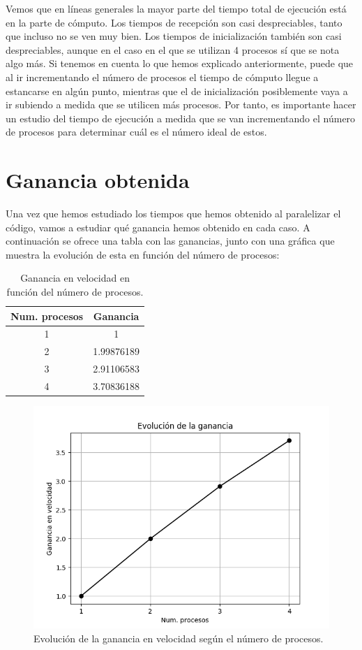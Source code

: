 \documentclass[11pt,a4paper]{article}
\begin{document}
Vemos que en líneas generales la mayor parte del tiempo total de ejecución está en la parte de
cómputo. Los tiempos de recepción son casi despreciables, tanto que incluso no se ven muy bien.
Los tiempos de inicialización también son casi despreciables, aunque en el caso en el que se
utilizan 4 procesos sí que se nota algo más. Si tenemos en cuenta lo que hemos explicado
anteriormente, puede que al ir incrementando el número de procesos el tiempo de cómputo
llegue a estancarse en algún punto, mientras que el de inicialización posiblemente vaya
a ir subiendo a medida que se utilicen más procesos. Por tanto, es importante hacer un estudio
del tiempo de ejecución a medida que se van incrementando el número de procesos para determinar
cuál es el número ideal de estos.

\section{Ganancia obtenida}

Una vez que hemos estudiado los tiempos que hemos obtenido al paralelizar el código, vamos
a estudiar qué ganancia hemos obtenido en cada caso. A continuación se ofrece una tabla
con las ganancias, junto con una gráfica que muestra la evolución de esta en función del
número de procesos:

\begin{table}[H]
\centering
\begin{tabular}{|c|c|}
\hline
\textbf{Num. procesos} & \textbf{Ganancia} \\ \hline
1 & 1 \\ \hline
2 & 1.99876189 \\ \hline
3 & 2.91106583 \\ \hline
4 & 3.70836188 \\ \hline
\end{tabular}
\caption{Ganancia en velocidad en función del número de procesos.}
\label{tab:my-table2}
\end{table}

\begin{figure}[H]
  \centering
  \includegraphics[scale=0.5]{img/ganancia}
  \caption{Evolución de la ganancia en velocidad según el número de procesos.}
  \label{fig:ganancia}
\end{figure}
\end{document}
